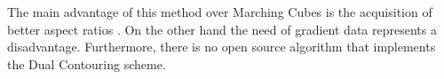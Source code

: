 The main advantage of this method over Marching Cubes is the acquisition of better aspect ratios \cite{Hermite2002}. On the other hand the need of gradient data
represents a disadvantage. Furthermore, there is no open source algorithm that implements the Dual Contouring scheme.



